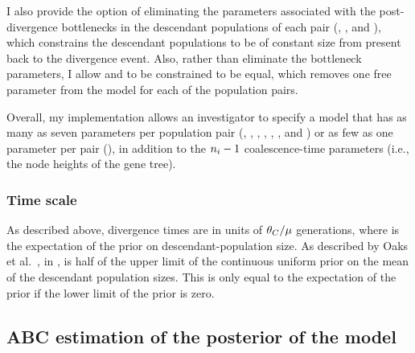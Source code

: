 I also provide the option of eliminating the parameters associated with the
post-divergence bottlenecks in the descendant populations of each pair
(\bottleTime{}, , and ),
which constrains the descendant populations to be of
constant size from present back to the divergence event.
Also, rather than eliminate the bottleneck parameters,
I allow  and  to be constrained to be
equal, which removes one free parameter from the model for each of the
population pairs.

Overall, my implementation allows an investigator to specify a model that has
as many as seven parameters per population pair
(\ancestralTheta{}, , ,
\bottleTime{}, , , and
\migrationRate{})
or as few as one parameter per pair
(\myTheta{}),
in addition to the $\popSampleSize{i}{} - 1$ coalescence-time parameters
(i.e., the node heights of the gene tree).

\subsubsection{Time scale}
As described above, divergence times are in units of
$\theta_{C}/\mu$ generations, where  is the expectation
of the prior on descendant-population size.
As described by Oaks et al.\ \cite{Oaks2012}, in \msb,  is half of
the upper limit of the continuous uniform prior on the mean of the descendant
population sizes.
This is only equal to the expectation of the prior if the lower limit of the
prior is zero.

\subsection{ABC estimation of the posterior of the model}
